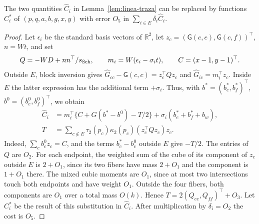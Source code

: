 \begin{lema}\label{lem:linea-reduccion}
The two quantities $\widehat C_i$ in Lemma~\ref{lem:linea-traza} can be replaced by functions
$C_i^*$ of $(p,q,a,b,g,x,y)$ with error $O_5$ in $\sum_{i\in E}\delta_i\widehat C_i$.
\end{lema}
\begin{proof}
Let $\epsilon_i$ be the standard basis vectors of $\mathbb R^2$, let $z_c=(\mathsf G(c,e),\mathsf
G(c,f))^\top$, $n=Wt$, and set
\[
 Q=-WD+nn^\top/s_{\mathrm{Sch}},\qquad m_i=W(\epsilon_i-\sigma_i t),\qquad C=(x-1,y-1)^\top .
\]
Outside $E$, block inversion gives $\widehat G_{cc}-\mathsf G(c,c)=z_c^\top Qz_c$ and $\widehat
G_{ic}=m_i^\top z_c$. Inside $E$ the latter expression has the additional term $+\sigma_i$. Thus,
with $b^*=(b_e^*,b_f^*)^\top$, $b^0=(b_e^0,b_f^0)^\top$, we obtain
\begin{align*}
 \widehat C_i&=m_i^\top\{C+G(b^*-b^0)-T/2\}+\sigma_i(b_e^*+b_f^*+b_w),\\
 T&=\sum_{c\notin E}\tau_2(p_c)\kappa_2(p_c)(z_c^\top Qz_c)z_c .
\end{align*}
Indeed, $\sum_cb_c^0 z_c=C$, and the terms $b_c^*-b_c^0$ outside $E$ give $-T/2$. The entries of
$Q$ are $O_2$. For each endpoint, the weighted sum of the cube of its component of $z_c$ outside
$E$ is $2+O_1$, since its two fibers have mass $2+O_1$ and the component is $1+O_1$ there. The
mixed cubic moments are $O_1$, since at most two intersections touch both endpoints and have
weight $O_1$. Outside the four fibers, both components are $O_1$ over a total mass $O(k)$. Hence
$T=2(Q_{ee},Q_{ff})^\top+O_3$. Let $C_i^*$ be the result of this substitution in $\widehat C_i$.
After multiplication by $\delta_i=O_2$ the cost is $O_5$.
\end{proof}

